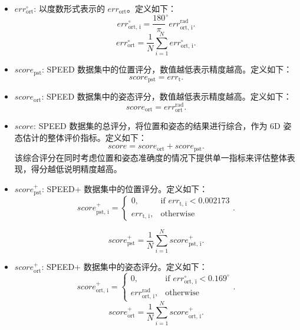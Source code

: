 \begin{itemize}
	\item $err_{\text{ort}}^{\circ}$: 以度数形式表示的 $err_{\text{ort}}$。定义如下：
	\begin{equation}
		err_{\text{ort, i}}^{\circ} =  \frac{180}{\pi}^{\circ} err_{\text{ort, i}}^{\text{rad}}.
	\end{equation}
	\begin{equation}
		err_{\text{ort}}^{\circ} = \frac{1}{N}\sum\limits_{i=1}^N err_{\text{ort, i}}^{\circ}. 
	\end{equation}
	
	\item $score_{\text{pst}}$: SPEED 数据集中的位置评分，数值越低表示精度越高。定义如下：
	\begin{equation}
		score_{\text{pst}} = err_{\text{t}}.
	\end{equation}
	
	\item $score_{\text{ort}}$: SPEED 数据集中的姿态评分，数值越低表示精度越高。定义如下：
	\begin{equation}
		score_{\text{ort}} = err_{\text{ort}}^{\text{rad}}.
	\end{equation}
	
	\item $score$: SPEED 数据集的总评分，将位置和姿态的结果进行综合，作为 6D 姿态估计的整体评价指标。定义如下：
	\begin{equation}
		score = score_{\text{ort}} + score_{\text{pst}}.
	\end{equation}
	该综合评分在同时考虑位置和姿态准确度的情况下提供单一指标来评估整体表现，得分越低说明精度越高。
	
	\item $score_{\text{pst}}^+$: SPEED+ 数据集中的位置评分。定义如下：
	\begin{equation}
		score_{\text{pst, i}}^+ = 
		\begin{cases}
			0, & \text{if } err_{\text{t, i}} < 0.002173 \\
			err_{\text{t, i}}, & \text{otherwise}
		\end{cases}.
	\end{equation}
	
	\begin{equation}
		score_{\text{pst}}^+ = \frac{1}{N}\sum\limits_{i=1}^N score_{\text{pst, i}}^+.
	\end{equation}
	
	\item $score_{\text{ort}}^+$: SPEED+ 数据集中的姿态评分。定义如下：
	\begin{equation}
		score_{\text{ort, i}}^+ = 
		\begin{cases}
			0, & \text{if } err_{\text{ort, i}}^{\circ} < 0.169^\circ \\
			err_{\text{ort, i}}^{\text{rad}}, & \text{otherwise}
		\end{cases}.
	\end{equation}
	\begin{equation}
		score_{\text{ort}}^+ = \frac{1}{N}\sum\limits_{i=1}^N score_{\text{ort, i}}^+.
	\end{equation}
	

\end{itemize}
